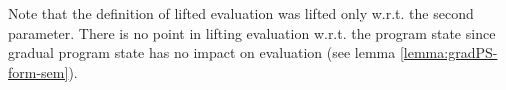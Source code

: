 Note that the definition of lifted evaluation was lifted only w.r.t. the second parameter.
There is no point in lifting evaluation w.r.t. the program state since gradual program state has no impact on evaluation (see lemma \ref{lemma:gradPS-form-sem}).

\begin{comment}
We define denotational semantics of gradual formulas analogous to the non-gradual variant (see definition \ref{def:frm-den-sem}):
\begin{definition}[Denotational Formula Semantics $\envs{\cdot}$ of Gradual Formulas]~\\
    \label{def:gfrm-den-sem}
    Let $\envs{\cdot} : \setGFormula \rightarrow \PP^{\setProgramState}$ be defined as
    \begin{displaymath}
    \envs{\grad{\phi}} \defeq \{~ \pi \in \setProgramState ~|~ \evalgphiGen{\pi}{\grad{\phi}} ~\}
    \end{displaymath}
\end{definition}
\end{comment}

